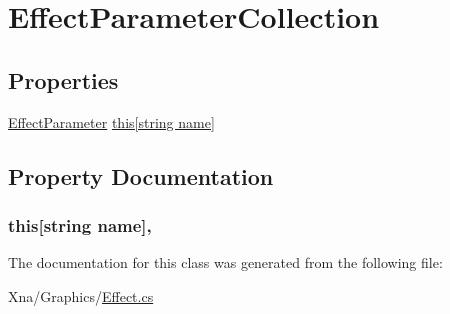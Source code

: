 \hypertarget{classMicrosoft_1_1Xna_1_1Framework_1_1Graphics_1_1EffectParameterCollection}{}\section{Effect\+Parameter\+Collection}
\label{classMicrosoft_1_1Xna_1_1Framework_1_1Graphics_1_1EffectParameterCollection}
\subsection*{Properties}
\begin{DoxyCompactItemize}
\item 
\hyperlink{classMicrosoft_1_1Xna_1_1Framework_1_1Graphics_1_1EffectParameter}{Effect\+Parameter} \hyperlink{classMicrosoft_1_1Xna_1_1Framework_1_1Graphics_1_1EffectParameterCollection_af525678c1d7afbd74600829db1b50735}{this\mbox{[}string name\mbox{]}}
\end{DoxyCompactItemize}


\subsection{Property Documentation}
\hypertarget{classMicrosoft_1_1Xna_1_1Framework_1_1Graphics_1_1EffectParameterCollection_af525678c1d7afbd74600829db1b50735}{}
\subsubsection[{this[string name]}]{ this\mbox{[}string name\mbox{]}\hspace{0.3cm}{\ttfamily [get]}, {\ttfamily [set]}}\label{classMicrosoft_1_1Xna_1_1Framework_1_1Graphics_1_1EffectParameterCollection_af525678c1d7afbd74600829db1b50735}


The documentation for this class was generated from the following file\+:\begin{DoxyCompactItemize}
\item 
Xna/\+Graphics/\hyperlink{Effect_8cs}{Effect.\+cs}\end{DoxyCompactItemize}

